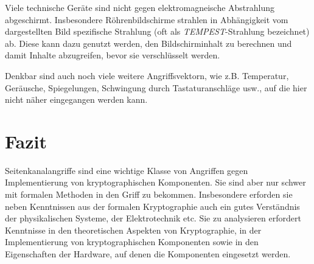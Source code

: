 Viele technische Geräte sind nicht gegen elektromagneische Abstrahlung
abgeschirmt. Insbesondere Röhrenbildschirme strahlen in Abhängigkeit vom
dargestellten Bild spezifische Strahlung (oft als
\emph{TEMPEST}-Strahlung bezeichnet) ab. Diese kann dazu genutzt werden,
den Bildschirminhalt zu berechnen und damit Inhalte abzugreifen, bevor
sie verschlüsselt werden.

Denkbar sind auch noch viele weitere Angriffsvektorn, wie
z.B. Temperatur, Geräusche, Spiegelungen, Schwingung durch Tastaturanschläge usw.,
auf die hier nicht näher eingegangen werden kann. 


\section{Fazit}
Seitenkanalangriffe sind eine wichtige Klasse von Angriffen gegen
Implementierung von kryptographischen Komponenten. Sie sind aber nur
schwer mit formalen Methoden in den Griff zu bekommen. Insbesondere
erforden sie neben Kenntnissen aus der formalen Kryptographie auch ein
gutes Verständnis der physikalischen Systeme, der Elektrotechnik etc.
Sie zu analysieren erfordert Kenntnisse in den theoretischen Aspekten
von Kryptographie, in der Implementierung von kryptographischen
Komponenten sowie in den Eigenschaften der Hardware, auf denen die
Komponenten eingesetzt werden.